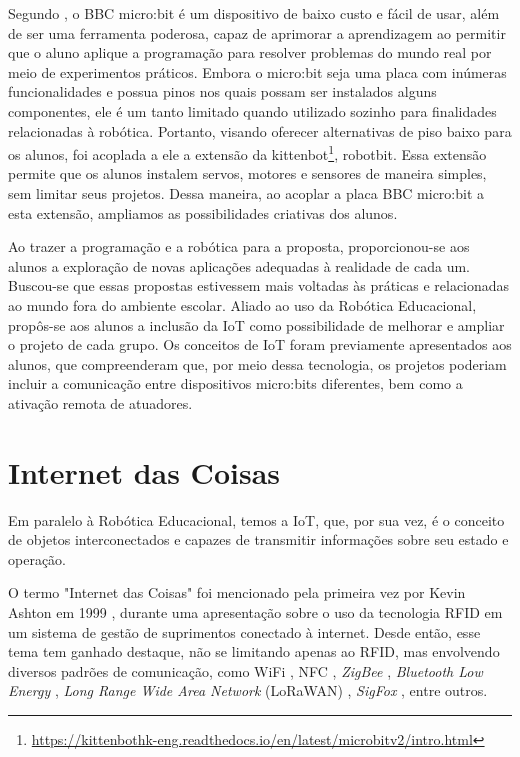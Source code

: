 \documentclass[portuguese]{textolivre}
\begin{document}
Segundo \textcite {osorio}, o BBC micro:bit é um dispositivo de baixo custo e fácil de usar, além de ser uma ferramenta poderosa, capaz de aprimorar a aprendizagem ao permitir que o aluno aplique a programação para resolver problemas do mundo real por meio de experimentos práticos. Embora o micro:bit seja uma placa com inúmeras funcionalidades e possua pinos nos quais possam ser instalados alguns componentes, ele é um tanto limitado quando utilizado sozinho para finalidades relacionadas à robótica. Portanto, visando oferecer alternativas de piso baixo para os alunos, foi acoplada a ele a extensão da kittenbot\footnote{\url{https://kittenbothk-eng.readthedocs.io/en/latest/microbitv2/intro.html}}, robotbit. Essa extensão permite que os alunos instalem servos, motores e sensores de maneira simples, sem limitar seus projetos. Dessa maneira, ao acoplar a placa BBC micro:bit a esta extensão, ampliamos as possibilidades criativas dos alunos.


Ao trazer a programação e a robótica para a proposta, proporcionou-se aos alunos a exploração de novas aplicações adequadas à realidade de cada um. Buscou-se que essas propostas estivessem mais voltadas às práticas e relacionadas ao mundo fora do ambiente escolar. Aliado ao uso da Robótica Educacional, propôs-se aos alunos a inclusão da IoT como possibilidade de melhorar e ampliar o projeto de cada grupo. Os conceitos de IoT foram previamente apresentados aos alunos, que compreenderam que, por meio dessa tecnologia, os projetos poderiam incluir a comunicação entre dispositivos micro:bits diferentes, bem como a ativação remota de atuadores.


\section{Internet das Coisas}\label{sec:third}

Em paralelo à Robótica Educacional, temos a IoT, que, por sua vez, é o conceito de objetos interconectados e capazes de transmitir informações sobre seu estado e operação.

O termo "Internet das Coisas" foi mencionado pela primeira vez por Kevin Ashton em 1999 \cite{ashton}, durante uma apresentação sobre o uso da tecnologia RFID em um sistema de gestão de suprimentos conectado à internet. Desde então, esse tema tem ganhado destaque, não se limitando apenas ao RFID, mas envolvendo diversos padrões de comunicação, como WiFi \cite{stallings2004ieee}, NFC \cite{Want2011}, \textit{ZigBee} \cite{LIU201475}, \textit{Bluetooth Low Energy} \cite{Hughes2015}, \textit{Long Range Wide Area Network} (LoRaWAN) \cite{FEHRI20181096}, \textit{SigFox} \cite{MEKKI2018}, entre outros. 
\end{document}
